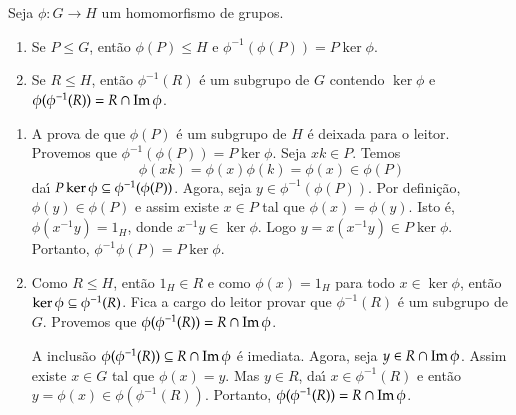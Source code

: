 \begin{lema}\label{imagem_direta_e_inversa_de_subgrupos}
	Seja $\phi : G \to H$ um homomorfismo de grupos.
	\begin{enumerate}
		\item Se $P \le G$, ent\~ao $\phi(P) \le H$ e $\phi^{-1}(\phi(P)) = P\ker\phi$.
		\item Se $R \le H$, ent\~ao $\phi^{-1}(R)$ \'e um subgrupo de $G$ contendo $\ker\phi$ e $\phi(\phi^{-1}(R)) = R \cap {\rm Im\,}\phi$.
	\end{enumerate}
\end{lema}
\begin{prova}
	\begin{enumerate}
		\item A prova de que $\phi(P)$ \'e um subgrupo de $H$ \'e deixada para o leitor. Provemos que $\phi^{-1}(\phi(P)) = P\ker\phi$. Seja $xk \in P$. Temos
		\[
			\phi(xk) = \phi(x)\phi(k) = \phi(x) \in \phi(P)
		\]
		da{\'\i} $P\ker\phi \subseteq \phi^{-1}(\phi(P))$. Agora, seja $y \in \phi^{-1}(\phi(P))$. Por defini\c{c}\~ao, $\phi(y) \in \phi(P)$ e assim existe $x \in P$ tal que $\phi(x) = \phi(y)$. Isto \'e, $\phi(x^{-1}y) = 1_H$, donde $x^{-1}y \in \ker\phi$. Logo $y = x(x^{-1}y)\in P\ker\phi$. Portanto, $\phi^{-1}\phi(P) = P\ker\phi$.
		\item Como $R \le H$, ent\~ao $1_H \in R$ e como $\phi(x) = 1_H$ para todo $x \in \ker\phi$, ent\~ao $\ker\phi \subseteq \phi^{-1}(R)$. Fica a cargo do leitor provar que $\phi^{-1}(R)$ \'e um subgrupo de $G$. Provemos que $\phi(\phi^{-1}(R)) = R \cap {\rm Im\,}\phi$.

		A inclus\~ao $\phi(\phi^{-1}(R)) \subseteq R \cap {\rm Im\,}\phi$ \'e imediata. Agora, seja $y \in R \cap {\rm Im\,}\phi$. Assim existe $x \in G$ tal que $\phi(x) = y$. Mas $y \in R$, da{\'\i} $x \in \phi^{-1}(R)$ e ent\~ao $y = \phi(x) \in \phi(\phi^{-1}(R))$. Portanto, $\phi(\phi^{-1}(R)) = R \cap {\rm Im\,}\phi$.
	\end{enumerate}
\end{prova}

